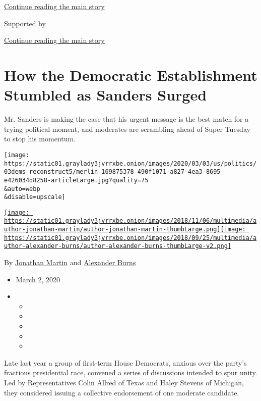 \protect\hyperlink{after-top}{Continue reading the main story}

Supported by

\protect\hyperlink{after-sponsor}{Continue reading the main story}

\hypertarget{how-the-democratic-establishment-stumbled-as-sanders-surged}{%
\section{How the Democratic Establishment Stumbled as Sanders
Surged}\label{how-the-democratic-establishment-stumbled-as-sanders-surged}}

Mr. Sanders is making the case that his urgent message is the best match
for a trying political moment, and moderates are scrambling ahead of
Super Tuesday to stop his momentum.

\texttt{[image: https://static01.graylady3jvrrxbe.onion/images/2020/03/03/us/politics/03dems-reconstruct5/merlin\_169875378\_490f1071-a827-4ea3-8695-e426034d8258-articleLarge.jpg?quality=75\\\&auto=webp\\\&disable=upscale]}

\href{https://www.nytimes3xbfgragh.onion/by/jonathan-martin}{\texttt{[image: https://static01.graylady3jvrrxbe.onion/images/2018/11/06/multimedia/author-jonathan-martin/author-jonathan-martin-thumbLarge.png]}}\href{https://www.nytimes3xbfgragh.onion/by/alexander-burns}{\texttt{[image: https://static01.graylady3jvrrxbe.onion/images/2018/09/25/multimedia/author-alexander-burns/author-alexander-burns-thumbLarge-v2.png]}}

By \href{https://www.nytimes3xbfgragh.onion/by/jonathan-martin}{Jonathan
Martin} and
\href{https://www.nytimes3xbfgragh.onion/by/alexander-burns}{Alexander
Burns}

\begin{itemize}
\item
  March 2, 2020
\item
  \begin{itemize}
  \item
  \item
  \item
  \item
  \item
  \end{itemize}
\end{itemize}

Late last year a group of first-term House Democrats, anxious over the
party's fractious presidential race, convened a series of discussions
intended to spur unity. Led by Representatives Colin Allred of Texas and
Haley Stevens of Michigan, they considered issuing a collective
endorsement of one moderate candidate.

